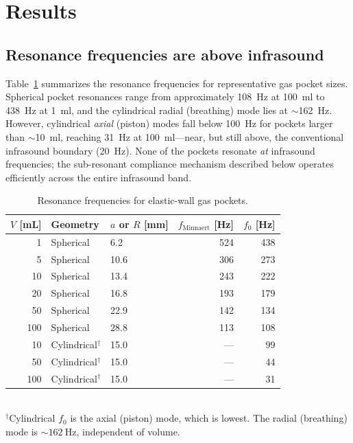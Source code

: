\documentclass[12pt]{article}
\begin{document}
\section{Results}
\label{sec:results}

\subsection{Resonance frequencies are above infrasound}
\label{sec:res_freq}

Table~\ref{tab:freq} summarizes the resonance frequencies for
representative gas pocket sizes.  Spherical pocket resonances range from
approximately \SI{108}{\hertz} at \SI{100}{\milli\litre} to
\SI{438}{\hertz} at \SI{1}{\milli\litre}, and the cylindrical radial
(breathing) mode lies at $\sim$\SI{162}{\hertz}.  However, cylindrical
\emph{axial} (piston) modes fall below \SI{100}{\hertz} for pockets larger
than $\sim$\SI{10}{\milli\litre}, reaching \SI{31}{\hertz} at
\SI{100}{\milli\litre}---near, but still above, the conventional infrasound
boundary (\SI{20}{\hertz}).  None of the pockets resonate \emph{at}
infrasound frequencies; the sub-resonant compliance mechanism described
below operates efficiently across the entire infrasound band.

\begin{table}[htb]
\centering
\caption{Resonance frequencies for elastic-wall gas pockets.}
\label{tab:freq}
\begin{tabular}{@{}rllrr@{}}
\toprule
$V$ [mL] & Geometry & $a$ or $R$ [mm] & $f_\text{Minnaert}$ [Hz] & $f_0$ [Hz] \\
\midrule
  1  & Spherical                   &  6.2 & 524  &  438 \\
  5  & Spherical                   & 10.6 & 306  &  273 \\
 10  & Spherical                   & 13.4 & 243  &  222 \\
 20  & Spherical                   & 16.8 & 193  &  179 \\
 50  & Spherical                   & 22.9 & 142  &  134 \\
100  & Spherical                   & 28.8 & 113  &  108 \\
 10  & Cylindrical$^{\dagger}$     & 15.0 &  --- &   99 \\
 50  & Cylindrical$^{\dagger}$     & 15.0 &  --- &   44 \\
100  & Cylindrical$^{\dagger}$     & 15.0 &  --- &   31 \\
\bottomrule
\end{tabular}
\\[4pt]
{\footnotesize $^{\dagger}$Cylindrical $f_0$ is the axial (piston) mode,
which is lowest.  The radial (breathing) mode is ${\sim}\SI{162}{\hertz}$,
independent of volume.}
\end{table}
\end{document}
